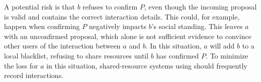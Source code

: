 
A potential risk is that $ b $ refuses to confirm $ P $, even though the incoming proposal is valid and contains the correct interaction details.
This could, for example, happen when confirming $ P $ negatively impacts $ b $'s social standing.
This leaves $ a $ with an unconfirmed proposal, which alone is not sufficient evidence to convince other users of the interaction between $ a $ and $ b $.
In this situation, $ a $ will add $ b $ to a local blacklist, refusing to share resources until $ b $ has confirmed $ P $.
To minimize the loss for $ a $ in this situation, shared-resource systems using \ModelName{} should frequently record interactions.

